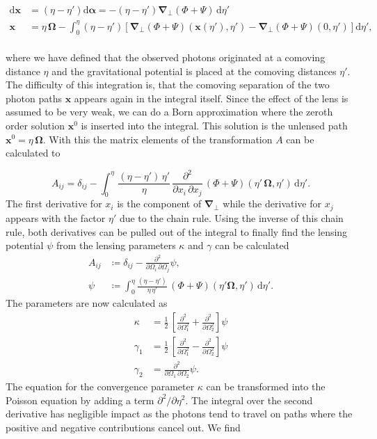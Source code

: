 \documentclass[oneside]{book}
\newcommand*{\rd}{\mathrm{d}}
\begin{document}
\begin{align}
    \rd \boldsymbol{x} &= (\eta-\eta') \rd \boldsymbol{\alpha} = - (\eta-\eta') \boldsymbol{\nabla}_\perp (\Phi+\Psi)\, \rd \eta'\\
    \boldsymbol{x} &= \eta\,\boldsymbol{\Omega} - \int_0^\eta (\eta-\eta') \left[\boldsymbol{\nabla}_\perp (\Phi+\Psi)(\boldsymbol{x}(\eta'),\eta')-\boldsymbol{\nabla}_\perp (\Phi+\Psi)(0,\eta')\right] \rd \eta',
\end{align}  \\
where we have defined that the observed photons originated at a comoving distance $\eta$ and the gravitational potential is placed at the comoving distances $\eta'$. The difficulty of this integration is, that the comoving separation of the two photon paths $\boldsymbol{x}$ appears again in the integral itself. Since the effect of the lens is assumed to be very weak, we can do a Born approximation where the zeroth order solution $\boldsymbol{x}^0$ is inserted into the integral. This solution is the unlensed path $\boldsymbol{x}^0=\eta\,\boldsymbol{\Omega}$. With this the matrix elements of the transformation $A$ can be calculated to 

\begin{equation}
    A_{ij} = \delta_{ij} - \int_0^\eta \, \frac{(\eta-\eta')\,\eta'}{\eta} \, \frac{\partial^2}{\partial x_i \, \partial x_j} \, (\Phi+\Psi)(\eta' \, \boldsymbol{\Omega},\eta')\, \rd \eta'.
\end{equation} 
The first derivative for $x_i$ is the component of $\boldsymbol{\nabla}_\perp$ while the derivative for $x_j$ appears with the factor $\eta'$ due to the chain rule. Using the inverse of this chain rule, both derivatives can be pulled out of the integral to finally find the lensing potential $\psi$ from the lensing parameters $\kappa$ and $\gamma$ can be calculated \begin{align}
    A_{ij} &\coloneqq \delta_{ij} - \frac{\partial^2}{\partial \Omega_i \, \partial \Omega_j} \psi,\\
    \psi &\coloneqq \int_0^\eta \frac{(\eta-\eta')}{\eta\,\eta'}\, (\Phi+\Psi)(\eta' \boldsymbol{\Omega},\eta') \, \rd \eta'.
\end{align}
The parameters are now calculated as \begin{align}
    \kappa &= \frac{1}{2} \, \left[\frac{\partial^2}{\partial \Omega_1^2}+\frac{\partial^2}{\partial \Omega_2^2}\right]  \psi \nonumber \\
    \gamma_1&= \frac{1}{2} \, \left[\frac{\partial^2}{\partial \Omega_1^2}-\frac{\partial^2}{\partial \Omega_2^2}\right]  \psi \\
    \gamma_2& = \frac{\partial^2}{\partial \Omega_1\,\partial\Omega_2} \psi .\nonumber
\end{align}
The equation for the convergence parameter $\kappa$ can be transformed into the Poisson equation by adding a term $\partial^2/\partial\eta^2$. The integral over the second derivative has negligible impact as the photons tend to travel on paths where the positive and negative contributions cancel out. We find 
\end{document}
